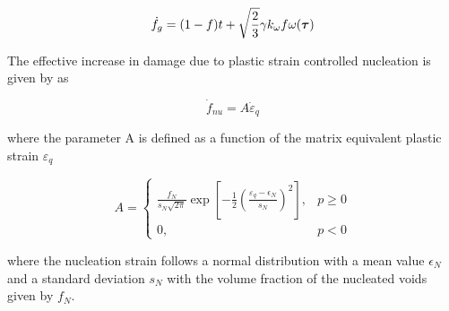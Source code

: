 \begin{equation}\label{eq:fg_final}
\dot{f}_g = (1-f)t + \sqrt{\frac{2}{3}}\gamma k_{\omega}f
\omega({\boldsymbol{\tau}})
\end{equation}

The effective increase in damage due to plastic strain controlled
nucleation is given by \cite{Chu1980} as

\begin{equation}\label{eq:dotf_nu}
\dot{f}_{nu} = A \dot{\varepsilon}_q
\end{equation}

where the parameter A is defined as a function of the matrix
equivalent plastic strain $\varepsilon_q$

\begin{equation}
A =
   \begin{cases}
     \frac{f_N}{s_N\sqrt{2\pi}}\exp\left[ -\frac{1}{2}\left(
       \frac{\varepsilon_q - \epsilon_N}{s_N}\right)^2\right], & p
     \geq 0\\ 0, & p <0
	\end{cases}
\end{equation}

where the nucleation strain follows a normal distribution with a mean
value $\epsilon_N$ and a standard deviation $s_N$ with the volume
fraction of the nucleated voids given by $f_N$.


